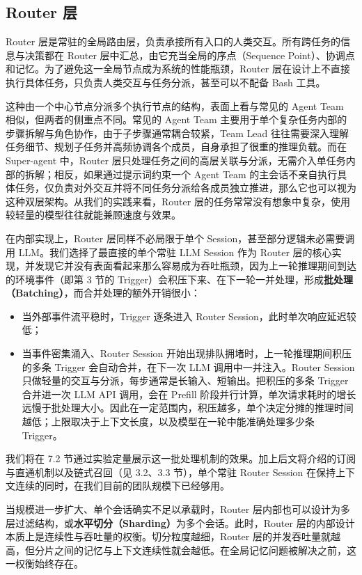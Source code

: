 \documentclass[11pt,a4paper,UTF8,fontset=windows]{ctexart}
\begin{document}
\subsection{Router 层}

Router 层是常驻的全局路由层，负责承接所有入口的人类交互。所有跨任务的信息与决策都在 Router 层中汇总，由它充当全局的序点（Sequence Point）、协调点和记忆。为了避免这一全局节点成为系统的性能瓶颈，Router 层在设计上不直接执行具体任务，只负责人类交互与任务分派，甚至可以不配备 Bash 工具。

这种由一个中心节点分派多个执行节点的结构，表面上看与常见的 Agent Team 相似，但两者的侧重点不同。常见的 Agent Team 主要用于单个复杂任务内部的步骤拆解与角色协作，由于子步骤通常耦合较紧，Team Lead 往往需要深入理解任务细节、规划子任务并高频协调各个成员，自身承担了很重的推理负载。而在 Super-agent 中，Router 层只处理任务之间的高层关联与分派，无需介入单任务内部的拆解；相反，如果通过提示词约束一个 Agent Team 的主会话不亲自执行具体任务，仅负责对外交互并将不同任务分派给各成员独立推进，那么它也可以视为这种双层架构。从我们的实践来看，Router 层的任务常常没有想象中复杂，使用较轻量的模型往往就能兼顾速度与效果。

在内部实现上，Router 层同样不必局限于单个 Session，甚至部分逻辑未必需要调用 LLM。我们选择了最直接的单个常驻 LLM Session 作为 Router 层的核心实现，并发现它并没有表面看起来那么容易成为吞吐瓶颈，因为上一轮推理期间到达的环境事件（即第 3 节的 Trigger）会积压下来、在下一轮一并处理，形成\textbf{批处理（Batching）}，而合并处理的额外开销很小：

\begin{itemize}
  \item 当外部事件流平稳时，Trigger 逐条进入 Router Session，此时单次响应延迟较低；
  \item 当事件密集涌入、Router Session 开始出现排队拥堵时，上一轮推理期间积压的多条 Trigger 会自动合并，在下一次 LLM 调用中一并注入。Router Session 只做轻量的交互与分派，每步通常是长输入、短输出。把积压的多条 Trigger 合并进一次 LLM API 调用，会在 Prefill 阶段并行计算，单次请求耗时的增长远慢于批处理大小。因此在一定范围内，积压越多，单个决定分摊的推理时间越低；上限取决于上下文长度，以及模型在一轮中能准确处理多少条 Trigger。
\end{itemize}

我们将在 7.2 节通过实验定量展示这一批处理机制的效果。加上后文将介绍的订阅与直通机制以及链式召回（见 3.2、3.3 节），单个常驻 Router Session 在保持上下文连续的同时，在我们目前的团队规模下已经够用。

当规模进一步扩大、单个会话确实不足以承载时，Router 层内部也可以设计为多层过滤结构，或\textbf{水平切分（Sharding）}为多个会话。此时，Router 层的内部设计本质上是连续性与吞吐量的权衡。切分粒度越细，Router 层的并发吞吐量就越高，但分片之间的记忆与上下文连续性就会越低。在全局记忆问题被解决之前，这一权衡始终存在。
\end{document}
